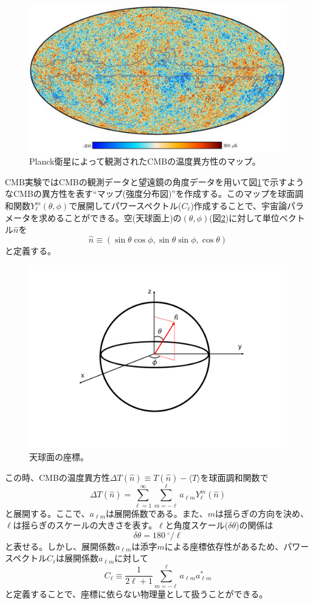 \begin{figure}[htbp]
  \centering
  \includegraphics[width=0.85\columnwidth]{2_cosmology/figs/planck_T_map_single.png}
  \caption{Planck衛星によって観測されたCMBの温度異方性のマップ。}
  \label{Planck_T}
\end{figure}
CMB実験ではCMBの観測データと望遠鏡の角度データを用いて図\ref{Planck_T}で示すようなCMBの異方性を表す``マップ(強度分布図)''を作成する。このマップを球面調和関数$Y^{m}_{\ell}(\theta,\phi)$で展開してパワースペクトル($C_{\ell}$)作成することで、宇宙論パラメータを求めることができる。空(天球面上)の$(\theta,\phi)$(図\ref{kyuuzahyou})に対して単位ベクトル$\hat{n}$を
\begin{equation}
  \hat{n} \equiv (\sin\theta\cos\phi,\sin\theta\sin\phi,\cos\theta)
\end{equation}
と定義する。
\begin{figure}[htbp]
  \centering
  \includegraphics[width=0.5\columnwidth]{2_cosmology/figs/kyuuzahyou.pdf}
  \caption{天球面の座標。}
  \label{kyuuzahyou}
\end{figure}
この時、CMBの温度異方性$\Delta T(\hat{n})\equiv T(\hat{n}) - \langle T \rangle$を球面調和関数で
\begin{equation}
  \Delta T(\hat{n}) = \sum_{\ell=1}^{\infty}\sum_{m=-\ell}^{\ell}a_{\ell m}Y^{m}_{\ell}(\hat{n})
\end{equation}
と展開する。ここで、$a_{\ell m}$は展開係数である。また、$m$は揺らぎの方向を決め、$\ell$は揺らぎのスケールの大きさを表す。$\ell$と角度スケール($\delta\theta$)の関係は
\begin{equation}
  \delta\theta = \SI{180}{^{\circ}}/\ell
\end{equation}
と表せる。しかし、展開係数$a_{\ell m}$は添字$m$による座標依存性があるため、パワースペクトル$C_{\ell}$は展開係数$a_{\ell m}$に対して
\begin{equation}
  C_{\ell}\equiv\frac{1}{2\ell+1}\sum_{m=-\ell}^{\ell}a_{\ell m}{a^{\ast}_{\ell m}}
\end{equation}
と定義することで、座標に依らない物理量として扱うことができる。

